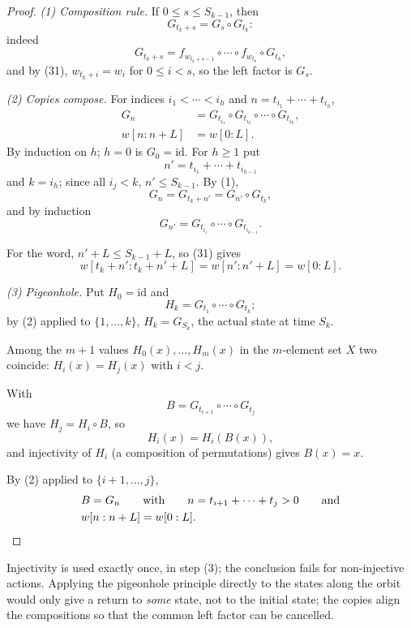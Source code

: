 \documentclass[11pt,reqno]{amsart}
\theoremstyle{definition}
\theoremstyle{remark}
\begin{document}
\begin{proof}\leavevmode\label{proof:49}
\emph{(1) Composition rule.} If \(0\le s\le S_{k-1}\), then
\[
G_{t_k+s}=G_s\circ G_{t_k}:
\]
indeed
\[
G_{t_k+s}=f_{w_{t_k+s-1}}\circ\cdots\circ f_{w_{t_k}}\circ G_{t_k},
\]
and by (31), \(w_{t_k+i}=w_i\) for \(0\le i<s\), so the left factor is
\(G_s\).

\emph{(2) Copies compose.} For indices \(i_1<\cdots<i_h\) and
\(n=t_{i_1}+\cdots+t_{i_h}\),
\[
\begin{aligned}
G_n&=G_{t_{i_1}}\circ G_{t_{i_2}}\circ\cdots\circ G_{t_{i_h}},\\
w[n:n+L]&=w[0:L].
\end{aligned}
\]
By induction on \(h\); \(h=0\) is \(G_0=\mathrm{id}\). For \(h\ge1\)
put
\[
n'=t_{i_1}+\cdots+t_{i_{h-1}}
\]
and \(k=i_h\); since all
\(i_j<k\), \(n'\le S_{k-1}\). By (1),
\[
G_n=G_{t_k+n'}=G_{n'}\circ
G_{t_k},
\]
and by induction
\[
G_{n'}=G_{t_{i_1}}\circ\cdots\circ
G_{t_{i_{h-1}}}.
\]

For the word, \(n'+L\le S_{k-1}+L\), so (31) gives
\[
w[t_k+n':t_k+n'+L]=w[n':n'+L]=w[0:L].
\]

\emph{(3) Pigeonhole.} Put \(H_0=\mathrm{id}\) and
\[
H_k=G_{t_1}\circ\cdots\circ G_{t_k};
\]
by (2) applied to
\(\{1,\ldots,k\}\), \(H_k=G_{S_k}\), the actual state at time \(S_k\).

Among the \(m+1\) values \(H_0(x),\ldots,H_m(x)\) in the \(m\)-element
set \(X\) two coincide: \(H_i(x)=H_j(x)\) with \(i<j\).

With
\[
B=G_{t_{i+1}}\circ\cdots\circ G_{t_j}
\]
we have \(H_j=H_i\circ B\),
so
\[
H_i(x)=H_i(B(x)),
\]
and injectivity of \(H_i\) (a composition of
permutations) gives \(B(x)=x\).

By (2) applied to \(\{i+1,\ldots,j\}\),
\[
\begin{aligned}
&B=G_n\qquad \text{with}\qquad n=t_{i+1}+\cdots+t_j>0\qquad \text{and}\\
&w[n:n+L]=w[0:L].
\end{aligned}\qedhere
\]
\end{proof}

Injectivity is used exactly once, in step (3); the conclusion fails for
non-injective actions. Applying the pigeonhole principle directly to the
states along the orbit would only give a return to \emph{some} state, not to
the initial state; the copies align the compositions so that the common
left factor can be cancelled.
\end{document}
